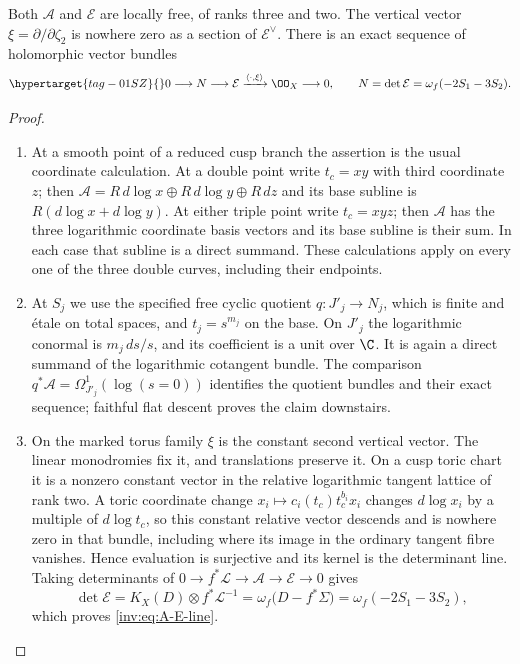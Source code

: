 \begin{proposition}\hypertarget{tag-01RR}{}\label{inv:A1.1}

Both $\mathcal A$ and $\mathcal E$ are locally free, of ranks three and
two.  The vertical vector $\xi=\partial/\partial\zeta_2$ is nowhere
zero as a section of $\mathcal E^\vee$.  There is an exact sequence
of holomorphic vector bundles
\begin{equation}\hypertarget{tag-01SZ}{}\label{inv:eq:A-E-line}
0\longrightarrow N\longrightarrow\mathcal E
 \xrightarrow{\langle\cdot,\xi\rangle}\OO_X\longrightarrow0,
\qquad N=\det\mathcal E=\omega_f(-2S_1-3S_2).
\end{equation}
\end{proposition}


\begin{proof}
\begin{enumerate}[label=\arabic*.,leftmargin=*]
\item At a smooth point of a reduced cusp branch the assertion is the usual
coordinate calculation.  At a double point write $t_c=xy$ with third
coordinate $z$; then
$\mathcal A=R\,d\log x\oplus R\,d\log y\oplus R\,dz$ and its
base subline is $R(d\log x+d\log y)$.  At either triple point write
$t_c=xyz$; then $\mathcal A$ has the three logarithmic coordinate
basis vectors and its base subline is their sum.  In each case that
subline is a direct summand.  These calculations apply on every one
of the three double curves, including their endpoints.

\item At $S_j$ we use the specified free cyclic quotient
$q:J'_j\to N_j$, which is finite and \'etale on total spaces, and
$t_j=s^{m_j}$ on the base.  On $J'_j$ the logarithmic conormal is
$m_j\,ds/s$, and its coefficient is a unit over $\C$.  It is again a
direct summand of the logarithmic cotangent bundle.  The comparison
$q^*\mathcal A=\Omega_{J'_j}^1(\log(s=0))$ identifies the quotient
bundles and their exact sequence; faithful flat descent proves the
claim downstairs.

\item On the marked torus family $\xi$ is the constant second vertical
vector.  The linear monodromies fix it, and translations preserve it.
On a cusp toric chart it is a nonzero constant vector in the relative
logarithmic tangent lattice of rank two.  A toric coordinate change
$x_i\mapsto c_i(t_c)t_c^{b_i}x_i$ changes $d\log x_i$ by a multiple
of $d\log t_c$, so this constant relative vector descends and is
nowhere zero in that bundle, including where its image in the
ordinary tangent fibre vanishes. Hence evaluation is surjective and its kernel
is the determinant line.  Taking determinants of
$0\to f^*\mathcal L\to\mathcal A\to\mathcal E\to0$ gives
\[
\det\mathcal E=K_X(D)\otimes f^*\mathcal L^{-1}
=\omega_f\bigl(D-f^*\Sigma\bigr)
=\omega_f(-2S_1-3S_2),
\]
which proves \eqref{inv:eq:A-E-line}.
\end{enumerate}
\end{proof}